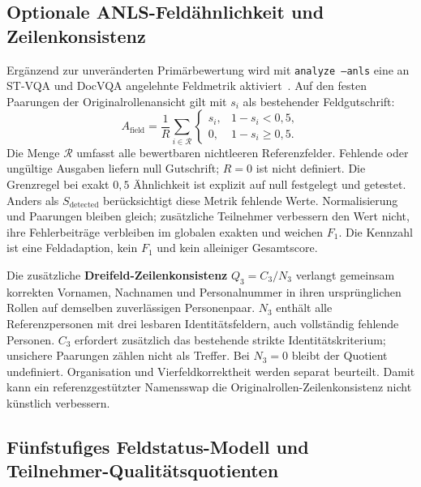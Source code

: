 \subsection{Optionale ANLS-Feldähnlichkeit und Zeilenkonsistenz}
\label{subsec:anls-zeilenkonsistenz}

Ergänzend zur unveränderten Primärbewertung wird mit \texttt{analyze --anls} eine an ST-VQA und DocVQA angelehnte Feldmetrik aktiviert~\cite{Biten2019STVQA,Mathew2021DocVQA}. Auf den festen Paarungen der Originalrollenansicht gilt mit $s_i$ als bestehender Feldgutschrift:
\begin{equation}
 A_{\mathrm{field}}=\frac{1}{R}\sum_{i\in\mathcal{R}}
 \begin{cases}s_i,&1-s_i<0{,}5,\\0,&1-s_i\geq0{,}5.\end{cases}
 \label{eq:anls-field}
\end{equation}
Die Menge $\mathcal{R}$ umfasst alle bewertbaren nichtleeren Referenzfelder. Fehlende oder ungültige Ausgaben liefern null Gutschrift; $R=0$ ist nicht definiert. Die Grenzregel bei exakt $0{,}5$ Ähnlichkeit ist explizit auf null festgelegt und getestet. Anders als $S_{\mathrm{detected}}$ berücksichtigt diese Metrik fehlende Werte. Normalisierung und Paarungen bleiben gleich; zusätzliche Teilnehmer verbessern den Wert nicht, ihre Fehlerbeiträge verbleiben im globalen exakten und weichen $F_1$. Die Kennzahl ist eine Feldadaption, kein $F_1$ und kein alleiniger Gesamtscore.

Die zusätzliche \textbf{Dreifeld-Zeilenkonsistenz} $Q_3=C_3/N_3$ verlangt gemeinsam korrekten Vornamen, Nachnamen und Personalnummer in ihren ursprünglichen Rollen auf demselben zuverlässigen Personenpaar. $N_3$ enthält alle Referenzpersonen mit drei lesbaren Identitätsfeldern, auch vollständig fehlende Personen. $C_3$ erfordert zusätzlich das bestehende strikte Identitätskriterium; unsichere Paarungen zählen nicht als Treffer. Bei $N_3=0$ bleibt der Quotient undefiniert. Organisation und Vierfeldkorrektheit werden separat beurteilt. Damit kann ein referenzgestützter Namensswap die Originalrollen-Zeilenkonsistenz nicht künstlich verbessern.

\subsection{Fünfstufiges Feldstatus-Modell und Teilnehmer-Qualitätsquotienten}
\label{subsec:feldstatus-teilnehmer}

